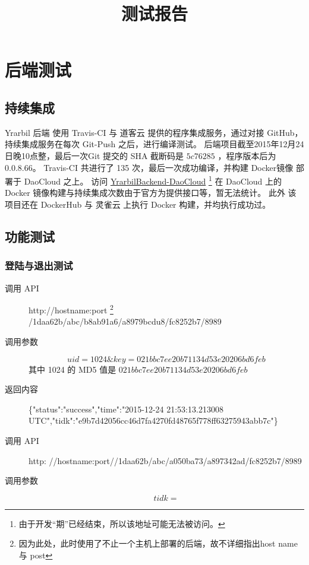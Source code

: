 \documentclass[UTF8]{report}
\title{测试报告}
\begin{document}
    \maketitle
    
    \tableofcontents
    \chapter{后端测试}
    \section{持续集成}
    Yrarbil 后端 使用 Travis-CI 与 道客云 提供的程序集成服务，通过对接 GitHub，持续集成服务在每次 Git-Push 之后，进行编译测试。
    后端项目截至2015年12月24日晚10点整，最后一次Git 提交的 SHA 截断码是 $5c76285$ ，程序版本后为 0.0.8.66。
    Travis-CI 共进行了 135 次，最后一次成功编译，并构建 Docker镜像 部署于 DaoCloud 之上。
    访问 \href{http://qinka-yrarbilbackend.daoapp.io}{YrarbilBackend-DaoCloud} 
    \footnote{由于开发“期”已经结束，所以该地址可能无法被访问。}
    在 DaoCloud 上的 Docker 镜像构建与持续集成次数由于官方为提供接口等，暂无法统计。
    此外 该项目还在 DockerHub 与 灵雀云 上执行 Docker 构建，并均执行成功过。
    \section{功能测试}
    \subsection{登陆与退出测试}
    \begin{description}
        \item[调用 API] http://hostname:port
        \footnote{因为此处，此时使用了不止一个主机上部署的后端，故不详细指出host name 与 post }
        /1daa62b/abc/b8ab91a6/a8979bcdu8/fc8252b7/8989
        \item[调用参数] $$uid=1024\&key=021bbc7ee20b71134d53e20206bd6feb$$
        其中 1024 的 MD5 值是 $021bbc7ee20b71134d53e20206bd6feb$
        \item[返回内容] \{"status":"success","time":"2015-12-24 21:53:13.213008 UTC","tidk":"e9b7d42056cc46d7fa4270fd48765f778ff63275943abb7c"\}        
    \end{description}
    \begin{description}
        \item[调用 API]
        http:       //hostname:port//1daa62b/abc/a050ba73/a897342ad/fc8252b7/8989
        \item[调用参数] $$tidk=$$
    \end{description}
\end{document}
